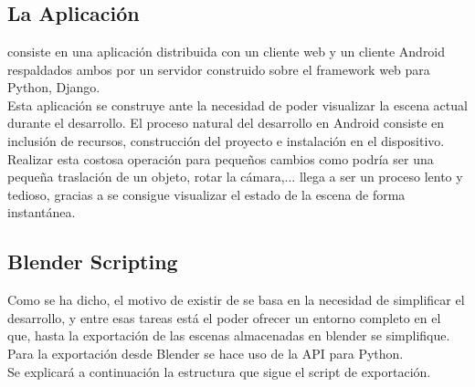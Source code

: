 
\chapter{\studio} %

\label{Chapter3} %



\section{La Aplicación \studio}
\studio consiste en una aplicación distribuida con un cliente web y un cliente Android respaldados ambos por un servidor construido sobre el framework web para Python, Django.\\
Esta aplicación se construye ante la necesidad de poder visualizar la escena actual durante el desarrollo. El proceso natural del desarrollo en Android consiste en inclusión de recursos, construcción del proyecto e instalación en el dispositivo. Realizar esta costosa operación para pequeños cambios como podría ser una pequeña traslación de un objeto, rotar la cámara,... llega a ser un proceso lento y tedioso, gracias a \studio se consigue visualizar el estado de la escena de forma instantánea.

\section{Blender Scripting}
Como se ha dicho, el motivo de existir de \studio se basa en la necesidad de simplificar el desarrollo, y entre esas tareas está el poder ofrecer un entorno completo en el que, hasta la exportación de las escenas almacenadas en blender se simplifique.\\

Para la exportación desde Blender se hace uso de la API para Python.\\
Se explicará a continuación la estructura que sigue el script de exportación.\\

